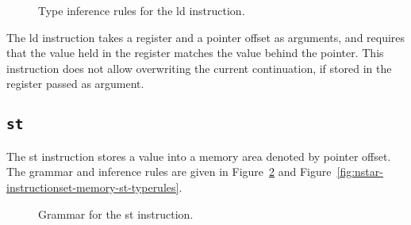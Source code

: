 \begin{figure}[H]
	\centering


	\caption{Type inference rules for the {\Iformat ld} instruction.}
	\label{fig:nstar-instructionset-memory-ld-typerules}
\end{figure}

The {\Iformat ld} instruction takes a register and a pointer offset as arguments, and requires that the value held in the register matches the value behind the pointer.
This instruction does not allow overwriting the current continuation, if stored in the register passed as argument.

\subsection{\texttt{st}}\label{subsec:nstar-instructionset-memory-st}

The {\Iformat st} instruction stores a value into a memory area denoted by pointer offset.
The grammar and inference rules are given in Figure~\ref{fig:nstar-instructionset-memory-st-grammar} and Figure~\ref{fig:nstar-instructionset-memory-st-typerules}.

\begin{figure}[H]
	\centering


	\caption{Grammar for the {\Iformat st} instruction.}
	\label{fig:nstar-instructionset-memory-st-grammar}
\end{figure}

